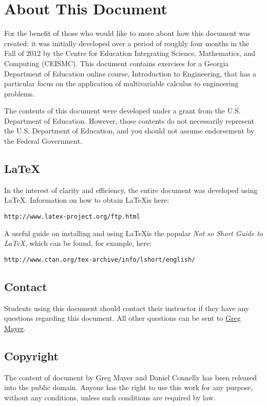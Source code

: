 \section*{About This Document}
For the benefit of those who would like to more about how this document was created: it was initially developed over a period of roughly four months in the Fall of 2012 by the Centre for Education Integrating Science, Mathematics, and Computing (CEISMC). This document contains exercises for a Georgia Department of Education online course, Introduction to Engineering, that has a particular focus on the application of multivariable calculus to engineering problems.

The contents of this document were developed under a grant from the U.S. Department of Education. However, those contents do not necessarily represent the U.S. Department of Education, and you should not assume endorsement by the Federal Government. 

\subsection*{\LaTeX}
In the interest of clarity and efficiency, the entire document was developed using \LaTeX. Information on how to obtain \LaTeX is here:
\begin{verbatim}
http://www.latex-project.org/ftp.html
\end{verbatim}
A useful guide on installing and using \LaTeX is the popular \textit{Not so Short Guide to \LaTeX}, which can be found, for example, here:
\begin{verbatim}
http://www.ctan.org/tex-archive/info/lshort/english/ 
\end{verbatim}

\subsection*{Contact}
Students using this document should contact their instructor if they have any questions regarding this document. All other questions can be sent to \href{mailto:gsmayer@gmail.com}{Greg Mayer}.

\subsection*{Copyright}
The content of \textit{\DocumentTitle}document by Greg Mayer and Daniel Connelly has been released into the public domain. Anyone has the right to use this work for any purpose, without any conditions, unless such conditions are required by law.